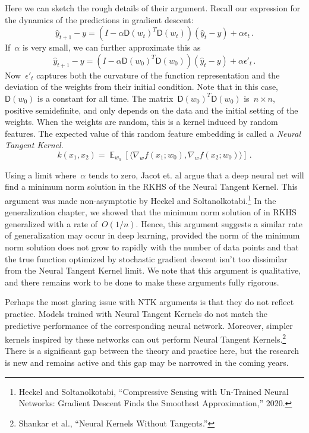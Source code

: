 \documentclass{tufte-book}
\begin{document}
Here we can sketch the rough details of their argument. Recall our
expression for the dynamics of the predictions in gradient descent: \[
    \hat{y}_{t+1}-y = (I -  \alpha \mathsf{D}(w_t)^T \mathsf{D}(w_t))(\hat{y}_t - y) + \alpha \epsilon_t\,.
\] If~\(\alpha\) is very small, we can further approximate this as \[
    \hat{y}_{t+1}-y = (I -  \alpha \mathsf{D}(w_0)^T \mathsf{D}(w_0))(\hat{y}_t - y) + \alpha \epsilon'_t\,.
\] Now~\(\epsilon'_t\) captures both the curvature of the function
representation and the deviation of the weights from their initial
condition. Note that in this case,~\(\mathsf{D}(w_0)\) is a constant for
all time. The matrix~\(\mathsf{D}(w_0)^T \mathsf{D}(w_0)\)
is~\(n \times n\), positive semidefinite, and only depends on the data
and the initial setting of the weights. When the weights are random,
this is a kernel induced by random features. The expected value of this
random feature embedding is called a \emph{Neural Tangent Kernel}. \[
    k(x_1,x_2) = \mathop\mathbb{E}_{w_0} \left[\langle \nabla_w f(x_1; w_0), \nabla_w f(x_2;w_0)
    \rangle \right] \,.
\]

Using a limit where~\(\alpha\) tends to zero, Jacot et. al argue that a
deep neural net will find a minimum norm solution in the RKHS of the
Neural Tangent Kernel. This argument was made non-asymptotic by Heckel
and Soltanolkotabi.\footnote{Heckel and Soltanolkotabi, {``Compressive
  Sensing with Un-Trained Neural Networks: Gradient Descent Finds the
  Smoothest Approximation,''} 2020.} In the generalization chapter, we
showed that the minimum norm solution of in RKHS generalized with a rate
of~\(O(1/n)\). Hence, this argument suggests a similar rate of
generalization may occur in deep learning, provided the norm of the
minimum norm solution does not grow to rapidly with the number of data
points and that the true function optimized by stochastic gradient
descent isn't too dissimilar from the Neural Tangent Kernel limit. We
note that this argument is qualitative, and there remains work to be
done to make these arguments fully rigorous.

Perhaps the most glaring issue with NTK arguments is that they do not
reflect practice. Models trained with Neural Tangent Kernels do not
match the predictive performance of the corresponding neural network.
Moreover, simpler kernels inspired by these networks can out perform
Neural Tangent Kernels.\footnote{Shankar et al., {``Neural Kernels
  Without Tangents.''}} There is a significant gap between the theory
and practice here, but the research is new and remains active and this
gap may be narrowed in the coming years.
\end{document}
